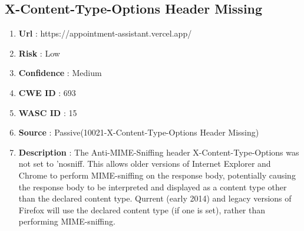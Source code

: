 \documentclass[openany]{report}
\begin{document}
\subsection{X-Content-Type-Options Header Missing}
\begin{enumerate}
    \item \textbf{Url} : https://appointment-assistant.vercel.app/
    \item \textbf{Risk} : Low
    \item \textbf{Confidence} : Medium
    \item \textbf{CWE ID} : 693
    \item \textbf{WASC ID} : 15
    \item \textbf{Source} : Passive(10021-X-Content-Type-Options Header Missing)
    \item \textbf{Description} : The Anti-MIME-Sniffing header X-Content-Type-Options was not set to 'nosniff. This allows older versions of Internet Explorer and Chrome to perform MIME-sniffing on the response body, potentially causing the response body to be interpreted and displayed as a content type other than the declared content type. Qurrent (early 2014) and legacy versions of Firefox will use the declared content type (if one is set), rather than performing MIME-sniffing.


\end{enumerate}
\end{document}
